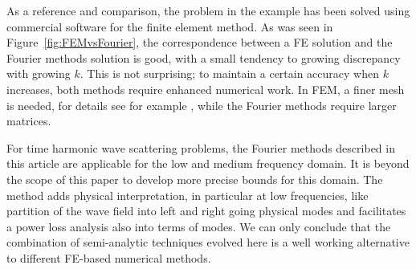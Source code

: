 \documentclass[numreferences]{kluwer}
\begin{document}
As a reference and comparison, the problem in the example has been
solved using commercial software for the finite element method.
As was seen in Figure~\ref{fig:FEMvsFourier}, the
correspondence between a FE solution and the Fourier methods solution
is good, with a small tendency to growing discrepancy with growing
$k$. This is not surprising; to maintain a certain accuracy when $k$
increases, both methods require enhanced numerical work. In FEM, a
finer mesh is needed, for details see for example
\cite{Ihlenburg:1998}, while the Fourier methods require larger
matrices.

For time harmonic wave scattering problems, the Fourier methods described in this article are applicable for the low and medium frequency domain. It is beyond the scope of this paper to develop more precise bounds for this domain. The method adds physical interpretation, in particular at low frequencies, like partition of the wave field into left and right going physical modes and facilitates a power loss analysis also into terms of modes. We can only conclude that the combination of semi-analytic techniques evolved here is a well working alternative to different FE-based numerical methods.




\end{document}
